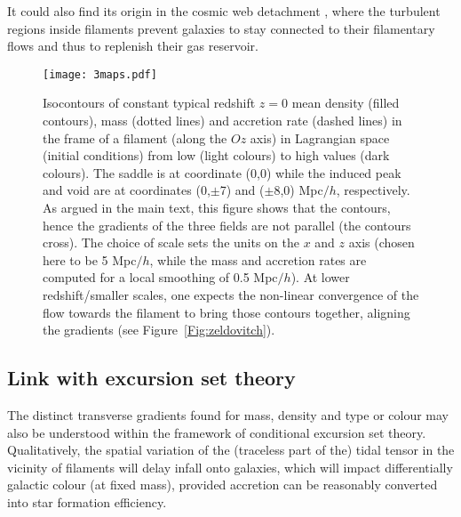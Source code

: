 \documentclass[useAMS,usenatbib]{mnras}
\begin{document}
It could also find its origin in the cosmic web detachment \citep[][]{Aragoncalvo2016}, where the turbulent regions inside filaments prevent galaxies to stay connected to their filamentary flows and thus to replenish their gas reservoir.  
%
\begin{figure}
\texttt{[image: 3maps.pdf]}
\caption{Isocontours of constant typical  redshift $z=0$ mean density (filled contours), mass (dotted lines) and accretion rate (dashed lines)  in the frame of a filament (along the $Oz$ axis) in Lagrangian space (initial conditions) from low (light colours) to high values (dark colours). 
The saddle is at coordinate (0,0) while the induced peak and void are at coordinates (0,$\pm$7) and ($\pm$8,0) Mpc$/h$, respectively. 
As argued in the main text, this figure shows that the contours, hence the gradients of the three fields are not parallel (the contours cross). 
The choice of scale sets the units on the $x$ and $z$ axis (chosen  here to be 5 Mpc$/h$, while the mass and accretion rates are computed for 
a local smoothing of 0.5 Mpc$/h$).
At lower redshift/smaller scales, one expects the non-linear  convergence of the flow towards the filament to bring those contours together, aligning the gradients (see Figure~\ref{Fig:zeldovitch}). 
}
\label{Fig:Mnualpha}
\end{figure}


\subsection{Link with excursion set theory}
\label{sec:EPS}

The distinct transverse gradients found for mass, density and type or colour  may also be understood within the framework of 
conditional excursion set theory.
Qualitatively, the spatial variation of the (traceless part of the) tidal tensor in the vicinity of filaments will delay infall onto galaxies, which will impact  differentially galactic colour (at fixed mass), provided accretion can be reasonably converted  into star formation efficiency.
\end{document}

